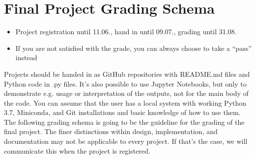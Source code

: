 \documentclass[a4paper,12pt]{report}
\begin{document}
\section*{Final Project Grading Schema}
\begin{itemize}
  \item Project registration until 11.06., hand in until 09.07., grading until 31.08.
  \item If you are not satisfied with the grade, you can always choose to take a “pass” instead
\end{itemize}
Projects should be handed in as GitHub repositories with README.md files and Python code in
.py files. It’s also possible to use Jupyter Notebooks, but only to demonstrate e.g. usage or
interpretation of the outputs, not for the main body of the code. You can assume that the user
has a local system with working Python 3.7, Miniconda, and Git installations and basic
knowledge of how to use them.
The following grading schema is going to be the guideline for the grading of the final project.
The finer distinctions within design, implementation, and documentation may not be applicable
to every project. If that’s the case, we will communicate this when the project is registered.
\end{document}
